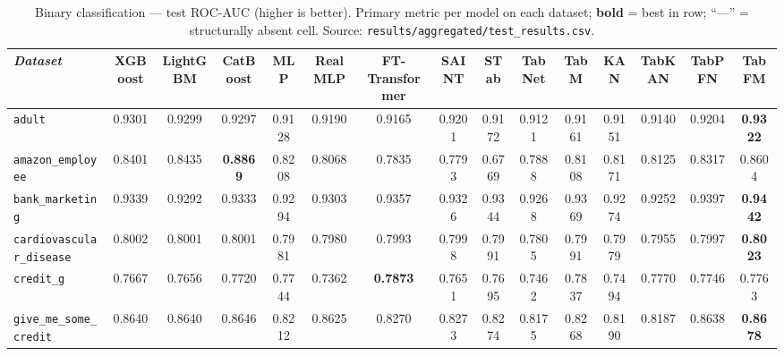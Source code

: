 

\begin{landscape}

\setlength{\floatsep}{10pt plus 2pt}

\begin{table}[htbp]
\centering
\scriptsize
\setlength{\tabcolsep}{3pt}
\caption[Binary classification --- complete results]{Binary classification --- test ROC-AUC (higher is better). Primary metric per model on each dataset; \textbf{bold} = best in row; ``---'' = structurally absent cell. Source: \texttt{results/\allowbreak aggregated/\allowbreak test\_\allowbreak results.\allowbreak csv}.}
\label{tab:app-binaria}
\begin{tabular}{lcccccccccccccc}
\toprule
\emph{Dataset} & XGBoost & LightGBM & CatBoost & MLP & RealMLP & FT-Transformer & SAINT & STab & TabNet & TabM & KAN & TabKAN & TabPFN & TabFM \\
\midrule
\texttt{adult} & 0.9301 & 0.9299 & 0.9297 & 0.9128 & 0.9190 & 0.9165 & 0.9201 & 0.9172 & 0.9121 & 0.9161 & 0.9151 & 0.9140 & 0.9204 & \textbf{0.9322} \\
\texttt{amazon\_\allowbreak employee} & 0.8401 & 0.8435 & \textbf{0.8869} & 0.8208 & 0.8068 & 0.7835 & 0.7793 & 0.6769 & 0.7888 & 0.8108 & 0.8171 & 0.8125 & 0.8317 & 0.8604 \\
\texttt{bank\_\allowbreak marketing} & 0.9339 & 0.9292 & 0.9333 & 0.9294 & 0.9303 & 0.9357 & 0.9326 & 0.9344 & 0.9268 & 0.9369 & 0.9274 & 0.9252 & 0.9397 & \textbf{0.9442} \\
\texttt{cardiovascular\_\allowbreak disease} & 0.8002 & 0.8001 & 0.8001 & 0.7981 & 0.7980 & 0.7993 & 0.7998 & 0.7991 & 0.7805 & 0.7991 & 0.7979 & 0.7955 & 0.7997 & \textbf{0.8023} \\
\texttt{credit\_g} & 0.7667 & 0.7656 & 0.7720 & 0.7744 & 0.7362 & \textbf{0.7873} & 0.7651 & 0.7695 & 0.7462 & 0.7837 & 0.7494 & 0.7770 & 0.7746 & 0.7763 \\
\texttt{give\_\allowbreak me\_\allowbreak some\_\allowbreak credit} & 0.8640 & 0.8640 & 0.8646 & 0.8212 & 0.8625 & 0.8270 & 0.8273 & 0.8274 & 0.8175 & 0.8268 & 0.8190 & 0.8187 & 0.8638 & \textbf{0.8678} \\

\end{tabular}
\end{table}
\end{landscape}
